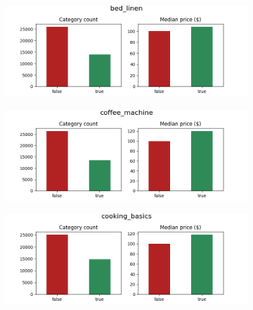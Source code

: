 \begin{figure}[H]
    \centering
    \begin{subfigure}[b]{0.3\textwidth}
        \centering
        \includegraphics[width=\textwidth]{figures/amenities/group1/bed_linen.png}
    \end{subfigure}
    \hfill
    \begin{subfigure}[b]{0.3\textwidth}
        \centering
        \includegraphics[width=\textwidth]{figures/amenities/group1/coffee_machine.png}
    \end{subfigure}
    \hfill
    \begin{subfigure}[b]{0.3\textwidth}
        \centering
        \includegraphics[width=\textwidth]{figures/amenities/group1/cooking_basics.png}
    \end{subfigure}
    \hfill
    \begin{subfigure}[b]{0.3\textwidth}
        \centering

\end{subfigure}
\end{figure}
